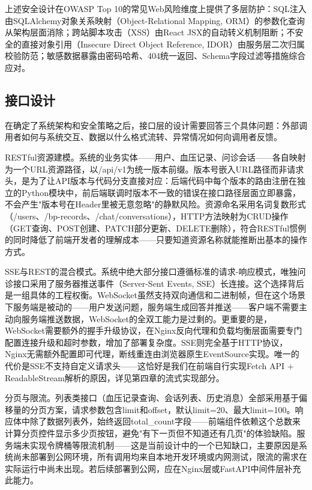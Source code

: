 \documentclass[zihao=-4,a4paper]{ctexart}
\begin{document}
上述安全设计在OWASP Top 10的常见Web风险维度上提供了多层防护：SQL注入由SQLAlchemy对象关系映射（Object-Relational Mapping, ORM）的参数化查询从架构层面消除；跨站脚本攻击（XSS）由React JSX的自动转义机制阻断；不安全的直接对象引用（Insecure Direct Object Reference, IDOR）由服务层二次归属校验防范；敏感数据暴露由密码哈希、404统一返回、Schema字段过滤等措施综合应对。

\subsection{接口设计}

在确定了系统架构和安全策略之后，接口层的设计需要回答三个具体问题：外部调用者如何与系统交互、数据以什么格式流转、异常情况如何向调用者反馈。

RESTful资源建模。系统的业务实体——用户、血压记录、问诊会话——各自映射为一个URL资源路径，以/api/v1为统一版本前缀。版本号嵌入URL路径而非请求头，是为了让API版本与代码分支直接对应：后端代码中每个版本的路由注册在独立的Python模块中，前后端联调时版本不一致的错误在接口路径层面立即暴露，不会产生"版本号在Header里被无意忽略"的静默风险。资源命名采用名词复数形式（/users、/bp-records、/chat/conversations），HTTP方法映射为CRUD操作（GET查询、POST创建、PATCH部分更新、DELETE删除），符合RESTful惯例的同时降低了前端开发者的理解成本——只要知道资源名称就能推断出基本的操作方式。

SSE与REST的混合模式。系统中绝大部分接口遵循标准的请求-响应模式，唯独问诊接口采用了服务器推送事件（Server-Sent Events, SSE）长连接。这个选择背后是一组具体的工程权衡。WebSocket虽然支持双向通信和二进制帧，但在这个场景下服务端是被动的——用户发送问题，服务端生成回答并推送——客户端不需要主动向服务端推送数据，WebSocket的全双工能力是过剩的。更重要的是，WebSocket需要额外的握手升级协议，在Nginx反向代理和负载均衡层面需要专门配置连接升级和超时参数，增加了部署复杂度。SSE则完全基于HTTP协议，Nginx无需额外配置即可代理，断线重连由浏览器原生EventSource实现。唯一的代价是SSE不支持自定义请求头——这恰好是我们在前端自行实现Fetch API + ReadableStream解析的原因，详见第四章的流式实现部分。

分页与限流。列表类接口（血压记录查询、会话列表、历史消息）全部采用基于偏移量的分页方案，请求参数包含limit和offset，默认limit=20、最大limit=100。响应体中除了数据列表外，始终返回total\_count字段——前端组件依赖这个总数来计算分页控件显示多少页按钮，避免"有下一页但不知道还有几页"的体验缺陷。服务端未实现令牌桶等限流机制——这是当前设计中的一个已知缺口，主要原因是系统尚未部署到公网环境，所有调用均来自本地开发环境或内网测试，限流的需求在实际运行中尚未出现。若后续部署到公网，应在Nginx层或FastAPI中间件层补充此能力。
\end{document}
